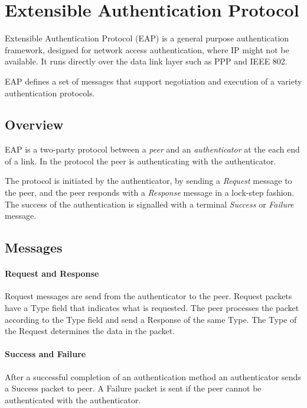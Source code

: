 \section{Extensible Authentication Protocol}


Extensible Authentication Protocol \cite{aboba2004extensible} (EAP) is a general purpose authentication framework, designed for network access authentication, where IP might not be available. 
It runs directly over the data link layer such as PPP  \cite{simpson1994rfc1661} and IEEE 802.

EAP defines a set of messages that support negotiation and execution of a variety authentication protocols.


\subsection{Overview}
EAP is a two-party protocol between a \textit{peer} and an \textit{authenticator} at the each end of a link. In the protocol the peer is authenticating with the authenticator.

The protocol is initiated by the authenticator, by sending a \textit{Request} message to the peer, and the peer responds with a \textit{Response} message in a lock-step fashion. 
The success of the authentication is signalled  with a terminal \textit{Success} or \textit{Failure} message.

\subsection{Messages}

\paragraph{Request and Response}

Request messages are send from the authenticator to the peer.
Request packets have a Type field that indicates what is requested.
The peer processes the packet according to the Type field and send a Response of the same Type.
The Type of the Request determines the data in the packet.

\paragraph{Success and Failure}

After a successful completion of an authentication method an authenticator sends a Success packet to peer. A Failure packet is sent if the peer cannot be authenticated with the authenticator.

